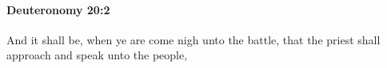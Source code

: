 
		\paragraph{Deuteronomy 20:2} %
			\label{DEUTERONOMY-20-2}

			And it shall be, when ye are come nigh unto the battle, that the priest shall approach and speak unto the people,



